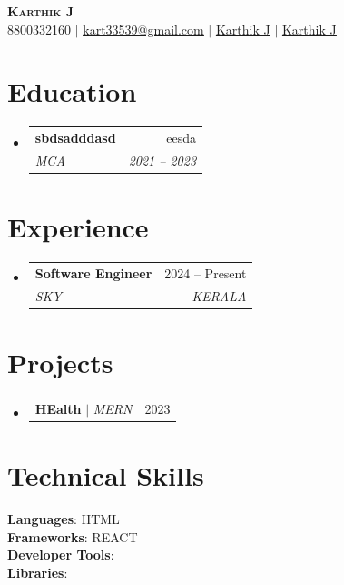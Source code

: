 \documentclass[letterpaper,11pt]{article}
\makeatletter
\newcommand{\resumeSubheading}[4]{
  \vspace{-2pt}\item
    \begin{tabular*}{0.97\textwidth}[t]{l@{\extracolsep{\fill}}r}
      \textbf{#1} & #2 \\
      \textit{\small#3} & \textit{\small #4} \\
    \end{tabular*}\vspace{-7pt}
}
\newcommand{\resumeProjectHeading}[2]{
    \item
    \begin{tabular*}{0.97\textwidth}{l@{\extracolsep{\fill}}r}
      \small#1 & #2 \\
    \end{tabular*}\vspace{-7pt}
}
\newcommand{\resumeSubHeadingListStart}{\begin{itemize}[leftmargin=0.15in, label={}]}
\newcommand{\resumeSubHeadingListEnd}{\end{itemize}}
\newcommand{\resumeItemListStart}{\begin{itemize}}
\newcommand{\resumeItemListEnd}{\end{itemize}\vspace{-5pt}}
\makeatother
\begin{document}
\begin{center}
    \textbf{\Huge \scshape Karthik J} \\ \vspace{1pt}
    \small 8800332160 $|$
    \href{mailto:kart33539@gmail.com}{\underline{{kart33539@gmail.com}}} $|$
    \href{https://Karthik J}{\underline{{Karthik J}}} $|$
    \href{https://Karthik J}{\underline{{Karthik J}}}
\end{center}

\section{Education}
  \resumeSubHeadingListStart

    \resumeSubheading
      {sbdsadddasd}{eesda}
      {MCA}{2021 -- 2023}
  \resumeSubHeadingListEnd

\section{Experience}
  \resumeSubHeadingListStart

    \resumeSubheading
      {Software Engineer}{2024 -- Present}
      {SKY}{KERALA}
      \resumeItemListStart

      \resumeItemListEnd
  \resumeSubHeadingListEnd

\section{Projects}
    \resumeSubHeadingListStart

    \resumeProjectHeading
      {\textbf{HEalth } $|$ \emph{MERN}}{2023}
      \resumeItemListStart

      \resumeItemListEnd
    \resumeSubHeadingListEnd

\section{Technical Skills}
 \begin{itemize}[leftmargin=0.15in, label={}]
    \small{\item{
     \textbf{Languages}{: HTML} \\
     \textbf{Frameworks}{: REACT} \\
     \textbf{Developer Tools}{: } \\
     \textbf{Libraries}{: }
    }}
 \end{itemize}
\end{document}
